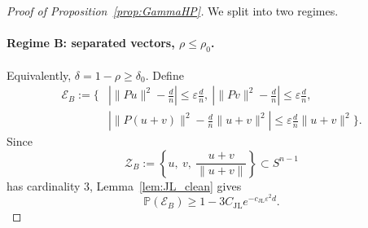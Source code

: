 \documentclass{article}
\begin{document}
\begin{proof}[Proof of Proposition~\ref{prop:GammaHP}]
We split into two regimes.

\paragraph{Regime B: separated vectors, \(\rho\le \rho_0\).}
Equivalently, \(\delta=1-\rho\ge\delta_0\). Define
\begin{align}
\mathcal E_B:=\Big\{&
\left|\|Pu\|^2-\tfrac{d}{n}\right|\le \varepsilon\tfrac{d}{n},\ 
\left|\|Pv\|^2-\tfrac{d}{n}\right|\le \varepsilon\tfrac{d}{n}, \nonumber\\
&
\left|\|P(u+v)\|^2-\tfrac{d}{n}\|u+v\|^2\right|
\le \varepsilon\tfrac{d}{n}\|u+v\|^2
\Big\}.
\label{eq:EB_hp}
\end{align}
Since
\[
\mathcal Z_B:=\left\{u,\ v,\ \frac{u+v}{\|u+v\|}\right\}\subset S^{n-1}
\]
has cardinality \(3\), Lemma~\ref{lem:JL_clean} gives
\begin{equation}
\mathbb P(\mathcal E_B)
\ge
1-3C_{\mathrm{JL}}e^{-c_{\mathrm{JL}}\varepsilon^2d}.
\label{eq:PB_clean}
\end{equation}


\end{proof}
\end{document}
